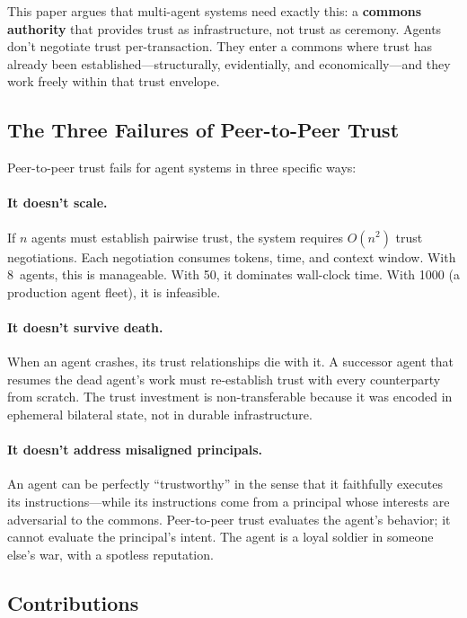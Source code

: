 \documentclass[11pt,a4paper]{article}
\theoremstyle{definition}
\theoremstyle{remark}
\begin{document}
This paper argues that multi-agent systems need exactly this: a \textbf{commons authority} that provides trust as infrastructure, not trust as ceremony. Agents don't negotiate trust per-transaction. They enter a commons where trust has already been established---structurally, evidentially, and economically---and they work freely within that trust envelope.

\subsection{The Three Failures of Peer-to-Peer Trust}

Peer-to-peer trust fails for agent systems in three specific ways:

\paragraph{It doesn't scale.} If $n$ agents must establish pairwise trust, the system requires $O(n^2)$ trust negotiations. Each negotiation consumes tokens, time, and context window. With 8~agents, this is manageable. With 50, it dominates wall-clock time. With 1000 (a production agent fleet), it is infeasible.

\paragraph{It doesn't survive death.} When an agent crashes, its trust relationships die with it. A successor agent that resumes the dead agent's work must re-establish trust with every counterparty from scratch. The trust investment is non-transferable because it was encoded in ephemeral bilateral state, not in durable infrastructure.

\paragraph{It doesn't address misaligned principals.} An agent can be perfectly ``trustworthy'' in the sense that it faithfully executes its instructions---while its instructions come from a principal whose interests are adversarial to the commons. Peer-to-peer trust evaluates the agent's behavior; it cannot evaluate the principal's intent. The agent is a loyal soldier in someone else's war, with a spotless reputation.

\subsection{Contributions}
\end{document}
